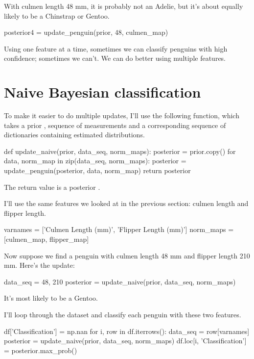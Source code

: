 \documentclass[12pt]{book}
\theoremstyle{exercise}
\begin{document}
With culmen length 48 mm, it is probably not an Adelie, but it's about
equally likely to be a Chinstrap or Gentoo.

\begin{code}
posterior4 = update_penguin(prior, 48, culmen_map)
\end{code}

Using one feature at a time, sometimes we can classify penguins with
high confidence; sometimes we can't. We can do better using multiple
features.

\section{Naive Bayesian classification}
\label{naive-bayesian-classification}

To make it easier to do multiple updates, I'll use the following
function, which takes a prior , sequence of
measurements and a corresponding sequence of dictionaries containing
estimated distributions.

\begin{code}
def update_naive(prior, data_seq, norm_maps):
    posterior = prior.copy()
    for data, norm_map in zip(data_seq, norm_maps):
        posterior = update_penguin(posterior, data, norm_map)
    return posterior
\end{code}

The return value is a posterior .

I'll use the same features we looked at in the previous section: culmen
length and flipper length.

\begin{code}
varnames = ['Culmen Length (mm)', 'Flipper Length (mm)']
norm_maps = [culmen_map, flipper_map]
\end{code}

Now suppose we find a penguin with culmen length 48 mm and flipper
length 210 mm. Here's the update:

\begin{code}
data_seq = 48, 210
posterior = update_naive(prior, data_seq, norm_maps)
\end{code}

It's most likely to be a Gentoo.

I'll loop through the dataset and classify each penguin with these two
features.

\begin{code}
df['Classification'] = np.nan
for i, row in df.iterrows():
    data_seq = row[varnames]
    posterior = update_naive(prior, data_seq, norm_maps)
    df.loc[i, 'Classification'] = posterior.max_prob()
\end{code}
\end{document}
